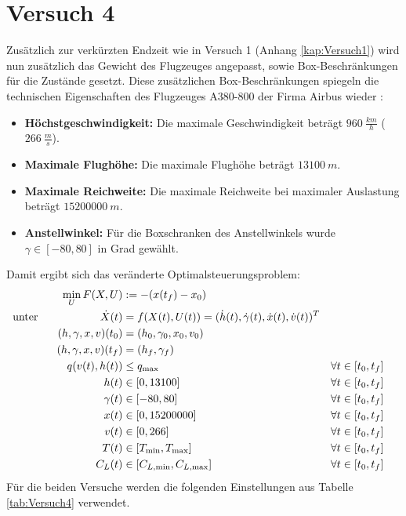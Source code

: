 \section{Versuch 4}\label{kap:Versuch4}
Zusätzlich zur verkürzten Endzeit wie in Versuch 1 (Anhang \ref{kap:Versuch1}) wird nun zusätzlich das Gewicht des Flugzeuges angepasst, sowie Box-Beschränkungen für die Zustände gesetzt. Diese zusätzlichen Box-Beschränkungen spiegeln die technischen Eigenschaften des Flugzeuges A380-800 der Firma Airbus wieder \cite{A380Tech}:
\begin{itemize}
\item \textbf{Höchstgeschwindigkeit:} Die maximale Geschwindigkeit beträgt $960 \ \frac{km}{h}$ ($266 \ \frac{m}{s}$).
%
\item \textbf{Maximale Flughöhe:} Die maximale Flughöhe beträgt $13100 \ m$.
%
\item \textbf{Maximale Reichweite:} Die maximale Reichweite bei maximaler Auslastung beträgt $15200000 \ m$.
%
\item \textbf{Anstellwinkel:} Für die Boxschranken des Anstellwinkels wurde $\gamma \in [-80,80]$ in Grad gewählt. 
\end{itemize}
Damit ergibt sich das veränderte Optimalsteuerungsproblem:
\begin{align*}
\min_{U} F(X,U) &:= -(x(t_f) - x_0) \\
\text{unter} \hspace{20mm} \dot{X}(t) &= f(X(t),U(t)) = (\dot{h}(t),\dot{\gamma}(t),\dot{x}(t),\dot{v}(t))^T \\
(h,\gamma,x,v)(t_0) &= (h_0,\gamma_0,x_0,v_0) \\
(h,\gamma,x,v)(t_f) &= (h_f,\gamma_f) \hspace{36mm} \\
q(v(t),h(t)) &\leq q_{\max} & & \forall t \in [t_0,t_f] \\
h(t) &\in [0,13100] & & \forall t \in [t_0,t_f] \\
\gamma(t) &\in [-80,80] & & \forall t \in [t_0,t_f] \\
x(t) &\in [0,15200000] & & \forall t \in [t_0,t_f] \\
v(t) &\in [0,266] & & \forall t \in [t_0,t_f] \\
T(t) &\in [T_{\min},T_{\max}] & & \forall t \in [t_0,t_f] \\
C_L(t) &\in [C_{L, \min},C_{L, \max}] & & \forall t \in [t_0,t_f]
\end{align*}
Für die beiden Versuche werden die folgenden Einstellungen aus Tabelle \ref{tab:Versuch4} verwendet.
